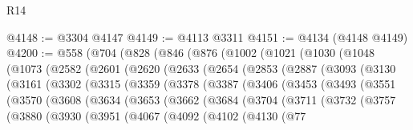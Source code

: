 \begin{lexlean}{R14}
\begin{coremodule}
{{{{{{{{{{{{{{{{{{{{{{{{{{{{{{{{{{{{{{{{{{{{{{{{{{{{{{{{{{{{{{{{{{{{{{{{{{{{{{{{{{{{{{{{{{{{{{{{{{{{{{{{{{@4148 := @3304 @4147
@4149 := @4113 @3311
@4151 := @4134 (@4148 @4149)
@4200 := @558
    (@704
      (@828
        (@846
          (@876
            (@1002
              (@1021
                (@1030
                  (@1048
                    (@1073
                      (@2582
                        (@2601
                          (@2620
                            (@2633
                              (@2654
                                (@2853
                                  (@2887
                                    (@3093
                                      (@3130
                                        (@3161
                                          (@3302
                                            (@3315
                                              (@3359
                                                (@3378
                                                  (@3387
                                                    (@3406
                                                      (@3453
                                                        (@3493
                                                          (@3551
                                                            (@3570
                                                              (@3608
                                                                (@3634
                                                                  (@3653
                                                                    (@3662
                                                                      (@3684
                                                                        (@3704
                                                                          (@3711
                                                                            (@3732
                                                                              (@3757
                                                                                (@3880
                                                                                  (@3930
                                                                                    (@3951
                                                                                      (@4067
                                                                                        (@4092
                                                                                          (@4102
                                                                                            (@4130
                                                                                              (@77
}}}}}}}}}}}}}}}}}}}}}}}}}}}}}}}}}}}}}}}}}}}}}}}}}}}}}}}}}}}}}}}}}}}}}}}}}}}}}}}}}}}}}}}}}}}}}}}}}}}}}}}}}}
\end{coremodule}
\end{lexlean}
